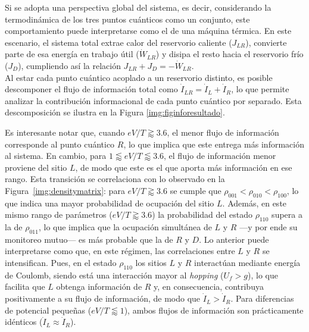 Si se adopta una perspectiva global del sistema, es decir, considerando la termodinámica de los tres puntos cuánticos como un conjunto, este comportamiento puede interpretarse como el de una máquina térmica. En este escenario, el sistema total extrae calor del reservorio caliente (\( J_{LR} \)), convierte parte de esa energía en trabajo útil (\( \dot{W}_{LR} \)) y disipa el resto hacia el reservorio frío (\( J_D \)), cumpliendo así la relación \( J_{LR} + J_D = -\dot{W}_{LR} \).
\\

Al estar cada punto cuántico acoplado a un reservorio distinto, es posible descomponer el flujo de información total como $\dot{I}_{LR} = \dot{I}_{L} + \dot{I}_{R}$, lo que permite analizar la contribución informacional de cada punto cuántico por separado. Esta descomposición se ilustra en la Figura \ref{img:figinforesultado}.



Es interesante notar que, cuando \( eV/T \gtrapprox 3.6 \), el menor flujo de información corresponde al punto cuántico \( R \), lo que implica que este entrega más información al sistema. En cambio, para \( 1 \lessapprox eV/T \lessapprox 3.6 \), el flujo de información menor proviene del sitio \( L \), de modo que este es el que aporta más información en ese rango. Esta transición se correlaciona con lo observado en la Figura~\ref{img:densitymatrix}: para \( eV/T \gtrapprox 3.6 \) se cumple que \(\rho_{001} < \rho_{010} < \rho_{100}\), lo que indica una mayor probabilidad de ocupación del sitio \( L \). Además, en este mismo rango de parámetros  ($eV/T \gtrapprox 3.6$) la probabilidad del estado \( \rho_{110} \) supera a la de \( \rho_{011} \), lo que implica que la ocupación simultánea de \( L \) y \( R \) ---y por ende su monitoreo mutuo--- es más probable que la de \( R \) y \( D \). Lo anterior puede interpretarse como que, en este régimen, las correlaciones entre \( L \) y \( R \) se intensifican. Pues, en el estado \( \rho_{110} \) los sitios \( L \) y \( R \) interactúan mediante energía de Coulomb, siendo está una interacción mayor al \textit{hopping} ($U_{f}>g$), lo que facilita que \( L \) obtenga información de \( R \) y, en consecuencia, contribuya positivamente a su flujo de información, de modo que \( \dot{I}_{L} > \dot{I}_{R} \). Para diferencias de potencial pequeñas (\( eV/T \lessapprox 1 \)), ambos flujos de información son prácticamente idénticos (\( \dot{I}_{L} \approx \dot{I}_{R} \)).
\\

